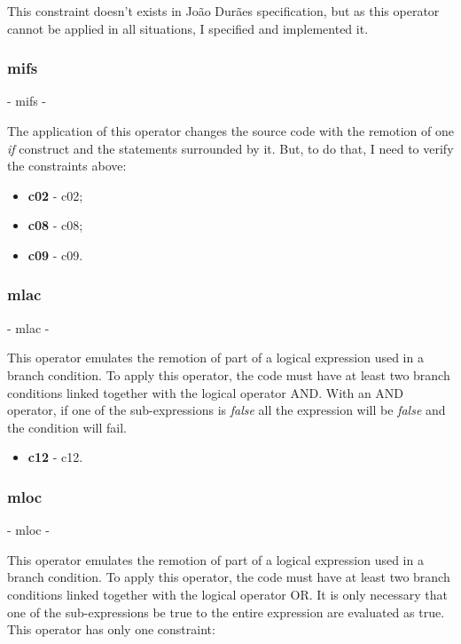 	This constraint doesn't exists in João Durães specification, but as this operator cannot be applied in all situations, I specified and implemented it.

	\subsubsection{\textbf{\acs{mifs}}} - \Acl{mifs} - 
	\hypertarget{mifs}{}

	The application of this operator changes the source code with the remotion of one \textit{if} construct and the statements surrounded by it.
	But, to do that, I need to verify the constraints above:
	\begin{itemize}
		\item \textbf{\acs{c02}} - \Acl{c02};
		\item \textbf{\acs{c08}} - \Acl{c08};
		\item \textbf{\acs{c09}} - \Acl{c09}.
	\end{itemize}

	\subsubsection{\textbf{\acs{mlac}}} - \Acl{mlac} - 
	\hypertarget{mlac}{}

	This operator emulates the remotion of part of a logical expression used in a branch condition. To apply this operator, the code must have at least two branch conditions linked together with the logical operator AND. With an AND operator, if one of the sub-expressions is \textit{false} all the expression will be \textit{false} and the condition will fail.
	\begin{itemize}
		\item \textbf{\acs{c12}} - \Acl{c12}.
	\end{itemize}

	\subsubsection{\textbf{\acs{mloc}}} - \Acl{mloc} - 
	\hypertarget{mloc}{}

	This operator emulates the remotion of part of a logical expression used in a branch condition. To apply this operator, the code must have at least two branch conditions linked together with the logical operator OR. It is only necessary that one of the sub-expressions be true to the entire expression are evaluated as true. This operator has only one constraint:

